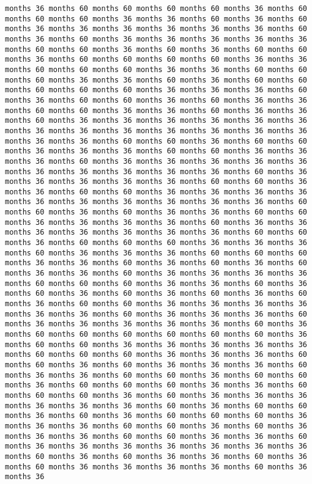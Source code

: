 \documentclass[11pt]{article}
\begin{document}
\begin{Verbatim}[commandchars=\\\{\}, frame=single, framerule=2mm, rulecolor=\color{outerrorbackground}]
months 36 months 60 months 60 months 60 months 60 months 36 months 60 months 60 months 60 months 36 months 36 months 60 months 36 months 60 months 36 months 36 months 36 months 36 months 36 months 36 months 60 months 36 months 60 months 36 months 36 months 36 months 36 months 36 months 60 months 60 months 36 months 60 months 36 months 60 months 60 months 36 months 60 months 60 months 60 months 60 months 36 months 36 months 60 months 60 months 60 months 36 months 36 months 60 months 60 months 60 months 36 months 36 months 60 months 36 months 60 months 60 months 60 months 60 months 60 months 36 months 36 months 36 months 60 months 36 months 60 months 60 months 36 months 60 months 36 months 36 months 60 months 60 months 36 months 36 months 60 months 36 months 36 months 60 months 36 months 36 months 36 months 36 months 36 months 36 months 36 months 36 months 36 months 36 months 36 months 36 months 36 months 36 months 36 months 60 months 60 months 36 months 60 months 60 months 36 months 36 months 36 months 60 months 60 months 36 months 36 months 36 months 60 months 36 months 36 months 36 months 36 months 36 months 36 months 36 months 36 months 36 months 36 months 60 months 36 months 36 months 36 months 36 months 36 months 60 months 60 months 36 months 36 months 60 months 60 months 36 months 36 months 36 months 36 months 36 months 36 months 36 months 36 months 36 months 36 months 60 months 60 months 36 months 60 months 36 months 36 months 60 months 60 months 36 months 36 months 36 months 36 months 60 months 36 months 36 months 36 months 36 months 36 months 36 months 36 months 60 months 60 months 36 months 60 months 60 months 60 months 36 months 36 months 36 months 60 months 36 months 36 months 36 months 60 months 60 months 60 months 36 months 36 months 60 months 36 months 60 months 36 months 60 months 36 months 36 months 60 months 36 months 36 months 36 months 36 months 60 months 60 months 60 months 36 months 36 months 60 months 36 months 60 months 36 months 60 months 36 months 60 months 36 months 60 months 36 months 60 months 60 months 36 months 36 months 36 months 36 months 36 months 36 months 60 months 36 months 36 months 36 months 60 months 36 months 36 months 36 months 36 months 36 months 60 months 36 months 60 months 60 months 60 months 60 months 60 months 60 months 36 months 60 months 60 months 36 months 36 months 36 months 36 months 36 months 60 months 60 months 60 months 36 months 36 months 36 months 60 months 60 months 36 months 60 months 36 months 36 months 36 months 60 months 36 months 36 months 60 months 60 months 36 months 60 months 60 months 36 months 60 months 60 months 60 months 36 months 36 months 60 months 60 months 60 months 36 months 60 months 36 months 36 months 36 months 36 months 36 months 36 months 60 months 36 months 60 months 60 months 36 months 60 months 36 months 60 months 60 months 60 months 36 months 36 months 36 months 60 months 60 months 36 months 60 months 36 months 36 months 36 months 60 months 60 months 36 months 36 months 60 months 36 months 36 months 36 months 36 months 36 months 36 months 36 months 60 months 36 months 60 months 36 months 36 months 60 months 36 months 60 months 36 months 36 months 36 months 36 months 60 months 36 months 36 
\end{Verbatim}
\end{document}
